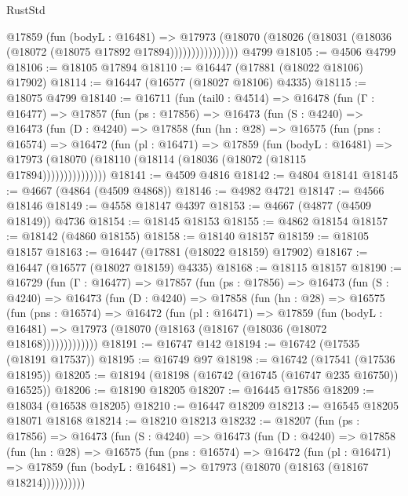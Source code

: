 \begin{lexlean}{RustStd}
\begin{coremodule}
{\begin{coremodule}
{{{{{{{{{{{{{{{{{{{{{{{{{{{{{{{{{{{{{{{{{{{{{{{{{{{{{{{                    @17859
                      (fun (bodyL : @16481) =>
                      @17973
                        (@18070
                          (@18026 (@18031 (@18036 (@18072 (@18075 @17892 @17894))))))))))))))))
    @4799
@18105 := @4506 @4799
@18106 := @18105 @17894
@18110 := @16447 (@17881 (@18022 @18106) @17902)
@18114 := @16447 (@16577 (@18027 @18106) @4335)
@18115 := @18075 @4799
@18140 := @16711
    (fun (tail0 : @4514) =>
    @16478
      (fun (Γ : @16477) =>
      @17857
        (fun (ps : @17856) =>
        @16473
          (fun (S : @4240) =>
          @16473
            (fun (D : @4240) =>
            @17858
              (fun (hn : @28) =>
              @16575
                (fun (pns : @16574) =>
                @16472
                  (fun (pl : @16471) =>
                  @17859
                    (fun (bodyL : @16481) =>
                    @17973 (@18070 (@18110 (@18114 (@18036 (@18072 (@18115 @17894)))))))))))))))
@18141 := @4509 @4816
@18142 := @4804 @18141
@18145 := @4667 (@4864 (@4509 @4868))
@18146 := @4982 @4721
@18147 := @4566 @18146
@18149 := @4558 @18147 @4397
@18153 := @4667 (@4877 (@4509 @18149)) @4736
@18154 := @18145 @18153
@18155 := @4862 @18154
@18157 := @18142 (@4860 @18155)
@18158 := @18140 @18157
@18159 := @18105 @18157
@18163 := @16447 (@17881 (@18022 @18159) @17902)
@18167 := @16447 (@16577 (@18027 @18159) @4335)
@18168 := @18115 @18157
@18190 := @16729
    (fun (Γ : @16477) =>
    @17857
      (fun (ps : @17856) =>
      @16473
        (fun (S : @4240) =>
        @16473
          (fun (D : @4240) =>
          @17858
            (fun (hn : @28) =>
            @16575
              (fun (pns : @16574) =>
              @16472
                (fun (pl : @16471) =>
                @17859
                  (fun (bodyL : @16481) =>
                  @17973 (@18070 (@18163 (@18167 (@18036 (@18072 @18168)))))))))))))
@18191 := @16747 @142
@18194 := @16742 (@17535 (@18191 @17537))
@18195 := @16749 @97
@18198 := @16742 (@17541 (@17536 @18195))
@18205 := @18194 (@18198 (@16742 (@16745 (@16747 @235 @16750)) @16525))
@18206 := @18190 @18205
@18207 := @16445 @17856
@18209 := @18034 (@16538 @18205)
@18210 := @16447 @18209
@18213 := @16545 @18205 @18071 @18168
@18214 := @18210 @18213
@18232 := @18207
    (fun (ps : @17856) =>
    @16473
      (fun (S : @4240) =>
      @16473
        (fun (D : @4240) =>
        @17858
          (fun (hn : @28) =>
          @16575
            (fun (pns : @16574) =>
            @16472
              (fun (pl : @16471) =>
              @17859 (fun (bodyL : @16481) => @17973 (@18070 (@18163 (@18167 @18214))))))))))
}}}}}}}}}}}}}}}}}}}}}}}}}}}}}}}}}}}}}}}}}}}}}}}}}}}}}}}
\end{coremodule}}
\end{coremodule}
\end{lexlean}
